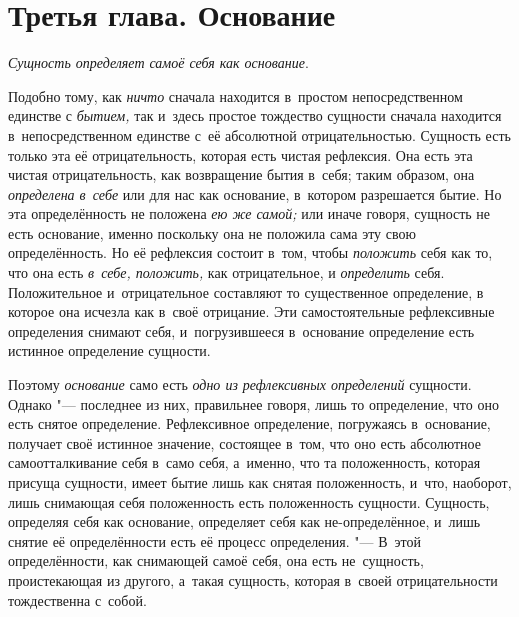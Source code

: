 \chapter[{\em Третья глава} Основание]{Третья глава. Основание}

{\em Сущность определяет самоё себя как основание}.

Подобно тому, как {\em ничто} сначала находится в~простом непосредственном
единстве с {\em бытием,} так и~здесь простое тождество сущности сначала
находится в~непосредственном единстве с~её абсолютной отрицательностью.
Сущность есть только эта её отрицательность, которая есть чистая рефлексия. Она
есть эта чистая отрицательность, как возвращение бытия в~себя; таким образом,
она {\em определена в~себе} или для нас как основание, в~котором разрешается
бытие. Но эта определённость не положена {\em ею же самой;} или иначе говоря,
сущность не есть основание, именно поскольку она не положила сама эту свою
определённость. Но её рефлексия состоит в~том, чтобы {\em положить} себя как
то, что она есть {\em в~себе, положить,} как отрицательное, и {\em определить}
себя. Положительное и~отрицательное составляют то существенное определение,
в которое она исчезла как в~своё отрицание. Эти самостоятельные рефлексивные
определения снимают себя, и~погрузившееся в~основание определение есть истинное
определение сущности.

Поэтому {\em основание} само есть {\em одно из рефлексивных определений}
сущности. Однако "--- последнее из них, правильнее говоря, лишь то определение,
что оно есть снятое определение. Рефлексивное определение, погружаясь
в~основание, получает своё истинное значение, состоящее в~том, что оно есть
абсолютное самоотталкивание себя в~само себя, а~именно, что та положенность,
которая присуща сущности, имеет бытие лишь как снятая положенность, и~что,
наоборот, лишь снимающая себя положенность есть положенность сущности.
Сущность, определяя себя как основание, определяет себя как не-определённое,
и~лишь снятие её определённости есть её процесс определения. "--- В~этой
определённости, как снимающей самоё себя, она есть не~сущность, проистекающая
из другого, а~такая сущность, которая в~своей отрицательности тождественна
с~собой.

